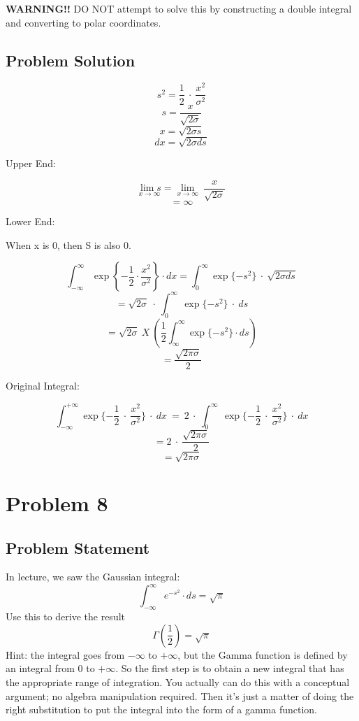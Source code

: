\documentclass[12pt]{article}
\theoremstyle{definition}
\begin{document}
\bigskip
\noindent
{\bf WARNING!!} DO NOT attempt to solve this by constructing a double integral and converting to polar coordinates.


\subsection*{Problem Solution}

$$ s^2 = \frac{1}{2} \ \cdot \ \frac{x^2}{\sigma^2} $$
$$ s = \frac{x}{\sqrt{2\sigma}}$$
$$ x = \sqrt{2 \sigma s} $$
$$ dx = \sqrt{2 \sigma ds}$$

Upper End:

$$ \underset{x \to \infty}{\lim s} = \underset{x \to \infty}{\lim} \ \frac{x}{\sqrt{2\sigma}}$$
$$ = \infty $$

Lower End:

When x is 0, then S is also 0.

$$ \int_{-\infty}^\infty \exp \left \{ - \frac{1}{2}  \cdot  \frac{x^2}{\sigma^2} \right \} \cdot dx  = \int_0^\infty \exp \{ -s^2 \} \ \cdot \ \sqrt{2 \sigma ds} $$
$$ = \sqrt{2 \sigma} \ \cdot \ \int_0^\infty \ \exp \{ -s^2 \} \ \cdot \ ds $$
$$ = \sqrt{2 \sigma} \ X \ ( \frac{1}{2} \int_\infty^\infty \exp \{ -s^2 \} \cdot ds ) $$
$$ = \frac{\sqrt{2\pi\sigma}}{2} $$


Original Integral:

$$ \int_{-\infty}^{+\infty} \exp \{ - \frac{1}{2} \ \cdot \ \frac{x^2}{\sigma^2} \} \ \cdot \ dx
\ = \
2 \ \cdot \ \int_0^\infty \ \exp \{ - \frac{1}{2} \ \cdot \ \frac{x^2}{\sigma^2} \} \ \cdot \ dx
$$
$$ = 2 \ \cdot \ \frac{\sqrt{2\pi\sigma}}{2} $$
$$ = \sqrt{2\pi\sigma} $$

\newpage
\section*{Problem 8}

\subsection*{Problem Statement}

In lecture, we saw the Gaussian integral:
$$
\int_{-\infty}^\infty e^{-s^2} \cdot ds = \sqrt{\pi}
$$
Use this to derive the result
$$
\Gamma \left ( \frac{1}{2} \right ) = \sqrt{\pi}
$$
Hint: the integral goes from $-\infty$ to $+\infty$, but the Gamma function is defined by an integral from $0$ to $+\infty$. So the first step is to obtain a new integral that has the appropriate range of integration. You actually can do this with a conceptual argument; no algebra manipulation required. Then it's just a matter of doing the right substitution to put the integral into the form of a gamma function.
\end{document}
